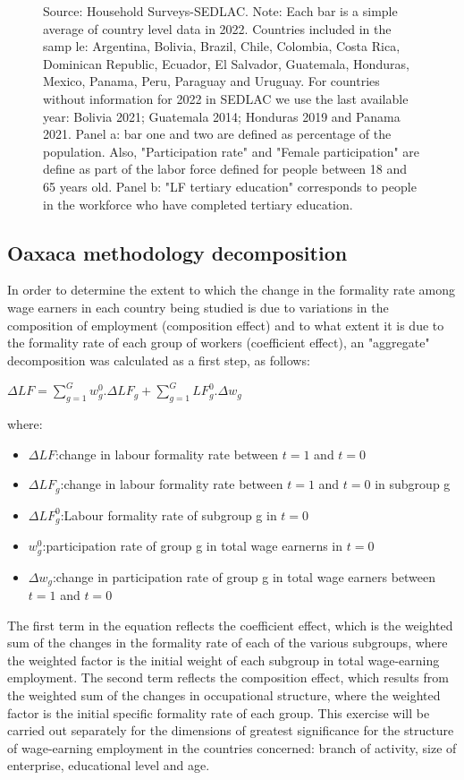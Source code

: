 \documentclass[english]{article}
\begin{document}
\begin{figure}[H]
                 \footnotesize{Source: Household Surveys-SEDLAC.}
                \footnotesize{Note: Each bar is a simple average of country level data in 2022. Countries included in the samp
                le: Argentina, Bolivia, Brazil, Chile, Colombia, Costa Rica, Dominican Republic, Ecuador, El Salvador, Guatemala, Honduras, Mexico, Panama, Peru, Paraguay and Uruguay. For countries without information for 2022 in SEDLAC we use the last available year: Bolivia 2021; Guatemala 2014; Honduras 2019 and Panama 2021. Panel a: bar one and two are defined as percentage of the population. Also, "Participation rate" and "Female participation" are define as part of the labor force defined for people between 18 and 65 years old. Panel b: "LF tertiary education" corresponds to people in the workforce who have completed tertiary education.}
        
            \end{figure}

\subsection{Oaxaca methodology decomposition}
In order to determine the extent to which the change in the formality rate among wage earners in each country being studied is due to variations in the composition of employment (composition effect) and to what extent it is due to the formality rate of each group of workers (coefficient effect), an "aggregate" decomposition was calculated as a first step, as follows:

${\Delta}LF=\sum_{g=1}^{G}w_g^{0}.{\Delta}LF_g+\sum_{g=1}^{G}LF_g^{0}.{\Delta}w_g$

where:
\begin{itemize}

\item ${\Delta}LF$:change in labour formality rate between $t=1$ and $t=0$ 
\item ${\Delta}LF_g$:change in labour formality rate between $t=1$ and $t=0$ in subgroup g
\item ${\Delta}LF_g^{0}$:Labour formality rate of subgroup g in $t=0$
\item $w_g^{0}$:participation rate of group g in total wage earnerns in $t=0$
\item ${\Delta}w_g$:change in participation rate of group g in total wage earners between $t=1$ and $t=0$ 
\end{itemize}

The first term in the equation reflects the coefficient effect, which is the weighted sum of the changes in the formality rate of each of the various subgroups, where the weighted factor is the initial weight of each subgroup in total wage-earning employment. The second term reflects the composition effect, which results from the weighted sum of the changes in occupational structure, where the weighted factor is the initial specific formality rate of each group.
This exercise will be carried out separately for the dimensions of greatest significance for the structure of wage-earning employment in the countries concerned: branch of activity, size of enterprise, educational level and age.
\end{document}
